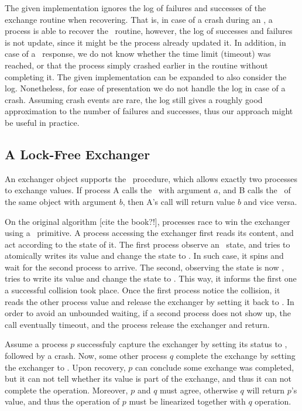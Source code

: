 The given implementation ignores the log of failures and successes of the exchange routine when recovering. That is, in case of a crash during an \exchange, a process is able to recover the \exchange\ routine, however, the log of successes and failures is not update, since it might be the process already updated it. In addition, in case of a \fail\ response, we do not know whether the time limit (timeout) was reached, or that the process simply crashed earlier in the routine without completing it. The given implementation can be expanded to also consider the log. Nonetheless, for ease of presentation we do not handle the log in case of a crash. Assuming crash events are rare, the log still gives a roughly good approximation to the number of failures and successes, thus our approach might be useful in practice.

\subsection{A Lock-Free Exchanger}
An exchanger object supports the \exchange\ procedure, which allows exactly two processes to exchange values. 
If process A calls the \exchange\ with argument $a$, and B calls the \exchange\ of the same object with argument $b$, then A's call will return value $b$ and vice versa.

On the original algorithm [cite the book?!], processes race to win the exchanger using a \CAS\ primitive. A process accessing the exchanger first reads its content, and act according to the state of it. The first process observe an \emptyst\ state, and tries to atomically writes its value and change the state to \waiting. In such case, it spins and wait for the second process to arrive. The second, observing the state is now \waiting, tries to write its value and change the state to \busy. This way, it informs the first one a successful collision took place. Once the first process notice the collision, it reads the other process value and release the exchanger by setting it back to \emptyst.
In order to avoid an unbounded waiting, if a second process does not show up, the call eventually timeout, and the process release the exchanger and return.

Assume a process $p$ successfuly capture the exchanger by setting its status to \waiting, followed by a crash. Now, some other process $q$ complete the exchange by setting the exchanger to \busy. Upon recovery, $p$ can conclude some exchange was completed, but it can not tell whether its value is part of the exchange, and thus it can not complete the operation. Moreover, $p$ and $q$ must agree, otherwise $q$ will return $p$'s value, and thus the operation of $p$ must be linearized together with $q$ operation.

